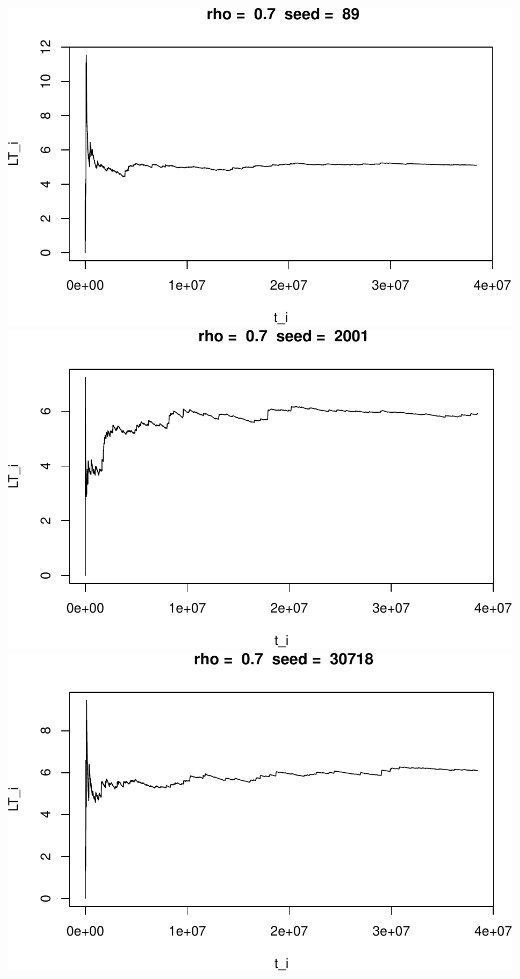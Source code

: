 \documentclass[]{article}
\begin{document}
\includegraphics{003_files/figure-latex/unnamed-chunk-17-7.pdf}
\includegraphics{003_files/figure-latex/unnamed-chunk-17-8.pdf}
\includegraphics{003_files/figure-latex/unnamed-chunk-17-9.pdf}
\end{document}
